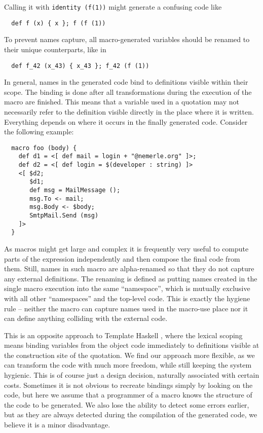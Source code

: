 \documentclass{llncs}
\begin{document}
Calling it with \verb,identity (f(1)), might generate a confusing code like

\begin{verbatim}
  def f (x) { x }; f (f (1))
\end{verbatim}

To prevent names capture, all macro-generated variables should be renamed 
to their unique counterparts, like in

\begin{verbatim}
  def f_42 (x_43) { x_43 }; f_42 (f (1))
\end{verbatim}

In general, names in the generated code bind to definitions visible within 
their scope. The binding is done after all transformations during the execution
of the macro are finished. This means that a variable used in a quotation 
may not necessarily refer to the definition visible directly in the place 
where it is written. Everything depends on where it occurs in the finally 
generated code. Consider the following example:

\begin{verbatim}
  macro foo (body) {
    def d1 = <[ def mail = login + "@nemerle.org" ]>;
    def d2 = <[ def login = $(developer : string) ]>
    <[ $d2;
       $d1;
       def msg = MailMessage ();
       msg.To <- mail;
       msg.Body <- $body;
       SmtpMail.Send (msg)
    ]>
  }
\end{verbatim}

As macros might get large and complex it is frequently very useful to compute
parts of the expression independently and then compose the final code from them.
Still, names in such macro are alpha-renamed so that they do not capture any 
external definitions. The renaming is defined as putting names created 
in the single macro execution into the same ``namespace'', which is
mutually exclusive with all other ``namespaces'' and the top-level code.
This is exactly the hygiene rule -- neither the macro can capture names
used in the macro-use place nor it can define anything colliding with the 
external code. 

This is an opposite approach to Template Haskell \cite{Haskell:Meta}, 
where the lexical scoping means binding variables from the object code immediately 
to definitions visible at the construction site of the quotation.
We find our approach more flexible, as we can transform the code with much
more freedom, while still keeping the system hygienic. This is of course just 
a design decision, naturally associated with certain costs. Sometimes it is not 
obvious to recreate bindings simply by looking on the code, but here we assume 
that a programmer of a macro knows the structure of the code to be generated. 
We also lose the ability to detect some errors earlier, but as they are always 
detected during the compilation of the generated code, we believe it is 
a minor disadvantage. 
\end{document}
